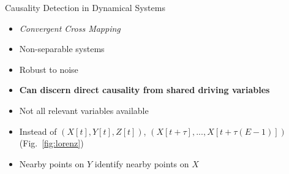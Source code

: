 \documentclass[final]{beamer}
\begin{document}
\begin{frame}{}
\begin{textblock}{22}
\begin{block}{Causality Detection in Dynamical Systems}
\begin{multicols}{2}
\footnotesize
\begin{itemize}
\item \text{ }\emph{Convergent Cross Mapping}
\item \text{ }Non-separable systems
\item \text{ }Robust to noise
\item \text{ }\textbf{Can discern direct causality from shared driving variables}
\end{itemize}
\columnbreak
\begin{itemize}
\item \text{ }Not all relevant variables available
\item \text{ }Instead of $(X[t], Y[t], Z[t])$, $(X[t+\tau], ..., X[t+\tau(E-1)])$ \cite{Takens81} (Fig.~\ref{fig:lorenz})
\item \text{ }Nearby points on $Y$ identify nearby points on $X$ \cite{Sugihara12}
\end{itemize}
\normalsize
\end{multicols}
\end{block}
\end{textblock}


\end{frame}
\end{document}
